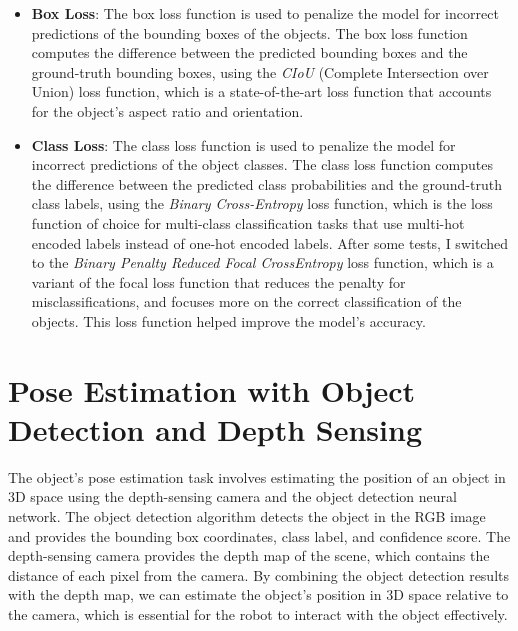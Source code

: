 \begin{itemize}
    \item \textbf{Box Loss}: The box loss function is used to penalize the model for incorrect predictions of the bounding
    boxes of the objects. The box loss function computes the difference between the predicted bounding boxes and the
    ground-truth bounding boxes, using the \textit{CIoU} (Complete Intersection over Union) loss function, which is a
    state-of-the-art loss function that accounts for the object's aspect ratio and orientation.
    \item \textbf{Class Loss}: The class loss function is used to penalize the model for incorrect predictions of the
    object classes. The class loss function computes the difference between the predicted class probabilities and the
    ground-truth class labels, using the \textit{Binary Cross-Entropy} loss function, which is the loss function of
    choice for multi-class classification tasks that use multi-hot encoded labels instead of one-hot encoded labels.
    After some tests, I switched to the \textit{Binary Penalty Reduced Focal CrossEntropy} loss function, which is a variant
    of the focal loss function that reduces the penalty for misclassifications, and focuses more on the correct
    classification of the objects. This loss function helped improve the model's accuracy.
\end{itemize}



\section{Pose Estimation with Object Detection and Depth Sensing}

The object's pose estimation task involves estimating the position of an object in 3D space using the depth-sensing
camera and the object detection neural network. The object detection algorithm detects the object 
in the RGB image and provides the bounding box coordinates, class label, and confidence score. 
The depth-sensing camera provides the depth map of the scene, which contains the distance of each pixel from the camera.
By combining the object detection results with the depth map, we can estimate the object's position in 3D space
relative to the camera, which is essential for the robot to interact with the object effectively.

